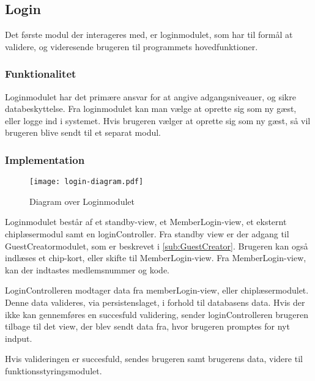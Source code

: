 \subsection{Login}
\label{sub:login}

Det første modul der interageres med, er loginmodulet, som har til formål at validere, og videresende brugeren til programmets hovedfunktioner.

\subsubsection{Funktionalitet}
\label{ssub:login_funktionalitet}

Loginmodulet har det primære ansvar for at angive adgangsniveauer, og sikre databeskyttelse. Fra loginmodulet kan man vælge at oprette sig som ny gæst, eller logge ind i systemet. Hvis brugeren vælger at oprette sig som ny gæst, så vil brugeren blive sendt til et separat modul.

\subsubsection{Implementation}
\label{ssub:login_implementation}

\begin{figure}
  \centering
  \texttt{[image: login-diagram.pdf]}
  \caption{Diagram over Loginmodulet}
\end{figure}

Loginmodulet består af et standby-view, et MemberLogin-view, et eksternt chiplæsermodul samt en loginController. Fra standby view er der adgang til GuestCreatormodulet, som er beskrevet i \cref{sub:GuestCreator}. Brugeren kan også indlæses et chip-kort, eller skifte til MemberLogin-view. Fra MemberLogin-view, kan der indtastes medlemsnummer og kode.

LoginControlleren modtager data fra memberLogin-view, eller chiplæsermodulet. Denne data valideres, via persistenslaget, i forhold til databasens data. Hvis der ikke kan gennemføres en succesfuld validering, sender loginControlleren brugeren tilbage til det view, der blev sendt data fra, hvor brugeren promptes for nyt indput.

Hvis valideringen er succesfuld, sendes brugeren samt brugerens data, videre til funktionsstyringsmodulet.
